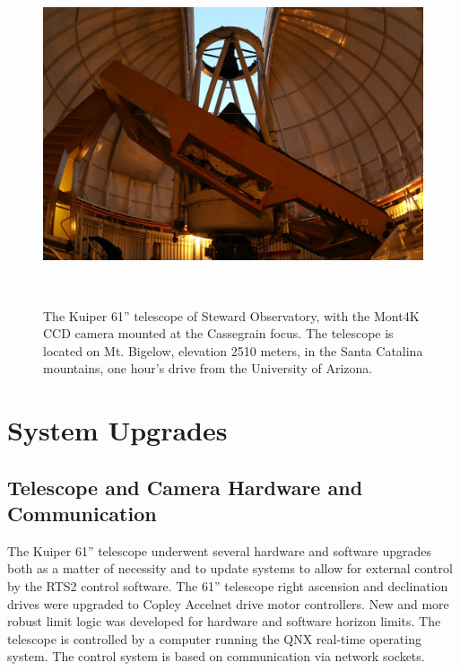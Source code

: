 \documentclass[]{spie}  %
\begin{document}
   \begin{figure} [ht]
   \begin{center}
   \includegraphics[height=10cm]{kuiper_in_dome.jpg}
  \end{center}
   \caption[] 
   { \label{fig:kuiper} 
The Kuiper 61'' telescope of Steward Observatory, with the Mont4K CCD camera mounted at the Cassegrain focus. The telescope is located on Mt. Bigelow, elevation 2510 meters, in the Santa Catalina mountains, one hour's drive from the University of Arizona.}
   \end{figure} 





\section{System Upgrades}

\subsection{Telescope and Camera Hardware and Communication}

The Kuiper 61'' telescope underwent several hardware and software upgrades both as a matter of necessity and to update systems to allow for external control by the RTS2 control software.
The 61'' telescope right ascension and declination drives were upgraded to Copley Accelnet drive motor controllers. New and more robust limit logic was developed for hardware and software horizon limits.  The telescope is controlled by a computer running the QNX real-time operating system. The control system is based on communication via network sockets.
\end{document}
